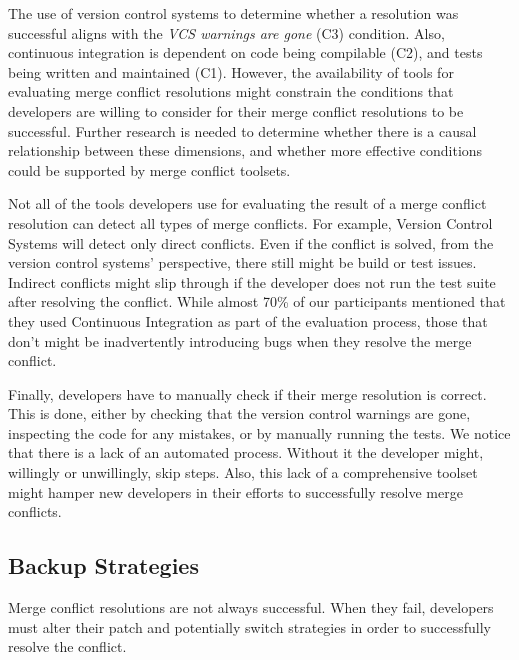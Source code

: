 The use of version control systems to determine whether a resolution was successful aligns with the \textit{VCS warnings are gone} (C3) condition.
Also, continuous integration is dependent on code being compilable (C2), and tests being written and maintained (C1).
However, the availability of tools for evaluating merge conflict resolutions might constrain the conditions that developers are willing to consider for their merge conflict resolutions to be successful.
Further research is needed to determine whether there is a causal relationship between these dimensions, and whether more effective conditions could be supported by merge conflict toolsets.

Not all of the tools developers use for evaluating the result of a merge conflict resolution can detect all types of merge conflicts.
For example, Version Control Systems will detect only direct conflicts.
Even if the conflict is solved, from the version control systems' perspective, there still might be build or test issues.
Indirect conflicts might slip through if the developer does not run the test suite after resolving the conflict.
While almost 70\% of our participants mentioned that they used Continuous Integration as part of the evaluation process, those that don't might be inadvertently introducing bugs when they resolve the merge conflict.

Finally, developers have to manually check if their merge resolution is correct.
This is done, either by checking that the version control warnings are gone, inspecting the code for any mistakes, or by manually running the tests.
We notice that there is a lack of an automated process.
Without it the developer might, willingly or unwillingly, skip steps.
Also, this lack of a comprehensive toolset might hamper new developers in their efforts to successfully resolve merge conflicts.

\subsection{Backup Strategies}

Merge conflict resolutions are not always successful.
When they fail, developers must alter their patch and potentially switch strategies in order to successfully resolve the conflict.

